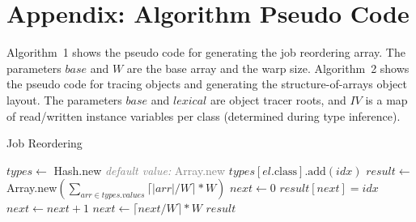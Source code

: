 \documentclass[preprint]{sigplanconf}
\begin{document}

\appendix
\section{Appendix: Algorithm Pseudo Code}
\label{sec:appendix_job_reorder}
\label{sec:appendix_obj_tracer}

Algorithm~1 shows the pseudo code for generating the job reordering array. The parameters $\mathit{base}$ and $W$ are the base array and the warp size. Algorithm~2 shows the pseudo code for tracing objects and generating the structure-of-arrays object layout. The parameters $\mathit{base}$ and $\mathit{lexical}$ are object tracer roots, and $\mathit{IV}$ is a map of read/written instance variables per class (determined during type inference).



\begin{algorithm}[!h]
\caption{Job Reordering}
\label{CHalgorithm}
\begin{algorithmic}[1]
\State $\mathit{types} \gets$ Hash.new \hfill \textcolor{gray}{\textit{default value:} Array.new}
    \State $\mathit{types}[\mathit{el}.\mbox{class}].\mbox{add}(\mathit{idx})$
\EndFor
\State $\mathit{result} \gets$ Array.new$(\sum_{\mathit{arr} \in \mathit{types}.\mathit{values}} \lceil |\mathit{arr}| / W \rceil * W)$
\State $\mathit{next} \gets 0$
        \State $\mathit{result}[\mathit{next}] = \mathit{idx}$
        \State $\mathit{next} \gets \mathit{next} + 1$
    \EndFor
    \State $\mathit{next} \gets \lceil \mathit{next} / W \rceil * W$
\EndFor
\State \Return $\mathit{result}$
\EndProcedure
\end{algorithmic}
\end{algorithm}
\end{document}
